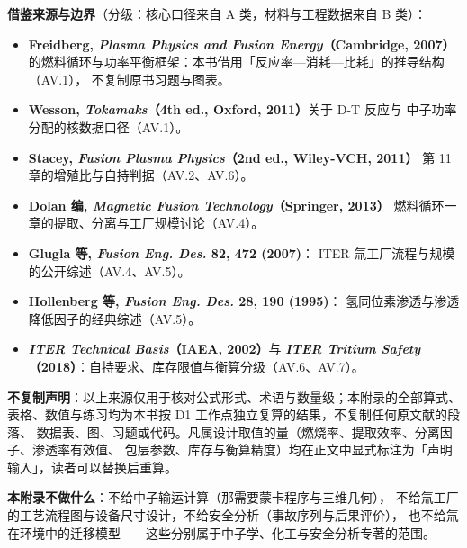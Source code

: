 \textbf{借鉴来源与边界}（分级：核心口径来自 A 类，材料与工程数据来自 B 类）：
\begin{itemize}
  \item \textbf{Freidberg, \emph{Plasma Physics and Fusion Energy}（Cambridge, 2007）}
  的燃料循环与功率平衡框架：本书借用「反应率—消耗—比耗」的推导结构（AV.1），
  不复制原书习题与图表。
  \item \textbf{Wesson, \emph{Tokamaks}（4th ed., Oxford, 2011）}关于 D-T 反应与
  中子功率分配的核数据口径（AV.1）。
  \item \textbf{Stacey, \emph{Fusion Plasma Physics}（2nd ed., Wiley-VCH, 2011）}
  第 11 章的增殖比与自持判据（AV.2、AV.6）。
  \item \textbf{Dolan 编, \emph{Magnetic Fusion Technology}（Springer, 2013）}
  燃料循环一章的提取、分离与工厂规模讨论（AV.4）。
  \item \textbf{Glugla 等, \emph{Fusion Eng. Des.} \textbf{82}, 472 (2007)}：
  ITER 氚工厂流程与规模的公开综述（AV.4、AV.5）。
  \item \textbf{Hollenberg 等, \emph{Fusion Eng. Des.} \textbf{28}, 190 (1995)}：
  氢同位素渗透与渗透降低因子的经典综述（AV.5）。
  \item \textbf{\emph{ITER Technical Basis}（IAEA, 2002）}与
  \textbf{\emph{ITER Tritium Safety}（2018）}：自持要求、库存限值与衡算分级（AV.6、AV.7）。
\end{itemize}

\textbf{不复制声明}：以上来源仅用于核对公式形式、术语与数量级；本附录的全部算式、
表格、数值与练习均为本书按 D1 工作点独立复算的结果，不复制任何原文献的段落、
数据表、图、习题或代码。凡属设计取值的量（燃烧率、提取效率、分离因子、渗透率有效值、
包层参数、库存与衡算精度）均在正文中显式标注为「声明输入」，读者可以替换后重算。

\textbf{本附录不做什么}：不给中子输运计算（那需要蒙卡程序与三维几何），
不给氚工厂的工艺流程图与设备尺寸设计，不给安全分析（事故序列与后果评价），
也不给氚在环境中的迁移模型——这些分别属于中子学、化工与安全分析专著的范围。
\endgroup
